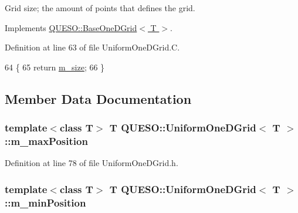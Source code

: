Grid size; the amount of points that defines the grid. 



Implements \hyperlink{class_q_u_e_s_o_1_1_base_one_d_grid_a388e922ba0c770039ab95e2cd1190dd6}{Q\-U\-E\-S\-O\-::\-Base\-One\-D\-Grid$<$ T $>$}.



Definition at line 63 of file Uniform\-One\-D\-Grid.\-C.


\begin{DoxyCode}
64 \{
65   \textcolor{keywordflow}{return} \hyperlink{class_q_u_e_s_o_1_1_uniform_one_d_grid_a4d76f44ccd66199aa55fa75aed57ffaa}{m\_size};
66 \}
\end{DoxyCode}


\subsection{Member Data Documentation}
\hypertarget{class_q_u_e_s_o_1_1_uniform_one_d_grid_ab65cb3991c8759837cdc0f3a5094a4c7}{
\subsubsection[{m\-\_\-max\-Position}]{\setlength{\rightskip}{0pt plus 5cm}template$<$class T$>$ T {\bf Q\-U\-E\-S\-O\-::\-Uniform\-One\-D\-Grid}$<$ T $>$\-::m\-\_\-max\-Position\hspace{0.3cm}{\ttfamily [protected]}}}\label{class_q_u_e_s_o_1_1_uniform_one_d_grid_ab65cb3991c8759837cdc0f3a5094a4c7}


Definition at line 78 of file Uniform\-One\-D\-Grid.\-h.

\hypertarget{class_q_u_e_s_o_1_1_uniform_one_d_grid_a1cf3c2bcc5b0dd70ecf5addcae839a2b}{
\subsubsection[{m\-\_\-min\-Position}]{\setlength{\rightskip}{0pt plus 5cm}template$<$class T$>$ T {\bf Q\-U\-E\-S\-O\-::\-Uniform\-One\-D\-Grid}$<$ T $>$\-::m\-\_\-min\-Position\hspace{0.3cm}{\ttfamily [protected]}}}\label{class_q_u_e_s_o_1_1_uniform_one_d_grid_a1cf3c2bcc5b0dd70ecf5addcae839a2b}



